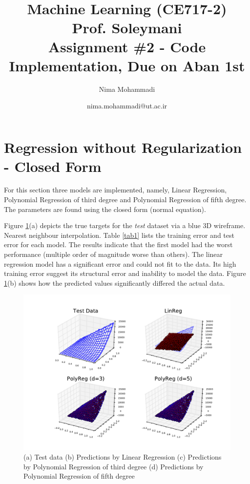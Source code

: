 \documentclass[paper=a4, fontsize=11pt]{scrartcl} %
\title{	
\normalfont \normalsize 
\textsc{} \\ [25pt] %
\horrule{0.5pt} \\[0.4cm] %
\huge Machine Learning (CE717-2)\\ %
\large Prof. Soleymani \\
\Large Assignment \#2 - Code Implementation, Due on Aban 1st
\horrule{2pt} \\[0.5cm] %
}
\author{Nima Mohammadi} %
\date{\normalsize nima.mohammadi@ut.ac.ir}
\numberwithin{figure}{section} %
\numberwithin{table}{section} %
\begin{document}
\maketitle %


\section{Regression without Regularization - Closed Form}

For this section three models are implemented, namely, Linear Regression, Polynomial Regression of third degree and Polynomial Regression of fifth degree. The parameters are found using the closed form (normal equation). 

Figure \ref{fig1}(a) depicts the true targets for the \textit{test} dataset via a blue 3D wireframe. Nearest neighbour interpolation. Table \ref{tab1} lists the training error and test error for each model. The results indicate that the first model had the worst performance (multiple order of magnitude worse than others). The linear regression model has a significant error and could not fit to the data. Its high training error suggest its structural error and inability to model the data. Figure \ref{fig1}(b) shows how the predicted values significantly differed the actual data.


\begin{figure}
\begin{center}
\includegraphics[width=17cm]{plot1.pdf}
\caption{(a) Test data (b) Predictions by Linear Regression (c) Predictions by Polynomial Regression of third degree (d) Predictions by Polynomial Regression of fifth degree}
\label{fig1}
\end{center}
\end{figure}
\end{document}
